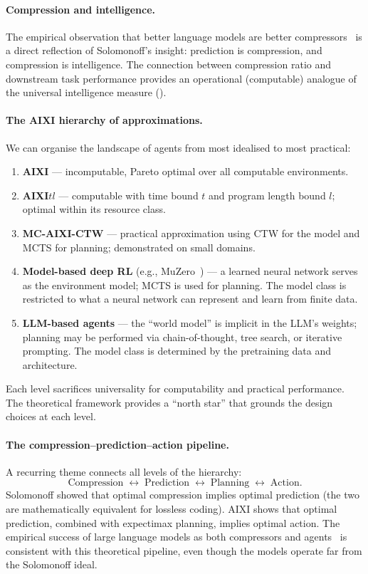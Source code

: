 \documentclass[11pt,a4paper]{article}
\theoremstyle{definition}
\theoremstyle{remark}
\begin{document}
\paragraph{Compression and intelligence.}
The empirical observation that better language models are better
compressors~\cite{Deletang2024} is a direct reflection of Solomonoff's
insight: prediction is compression, and compression is intelligence.
The connection between compression ratio and downstream task performance
provides an operational (computable) analogue of the universal intelligence
measure ().

\paragraph{The AIXI hierarchy of approximations.}
We can organise the landscape of agents from most idealised to most practical:
\begin{enumerate}[nosep]
\item \textbf{AIXI} --- incomputable, Pareto optimal over all computable environments.
\item \textbf{AIXI$tl$} --- computable with time bound $t$ and program length
      bound $l$; optimal within its resource class.
\item \textbf{MC-AIXI-CTW} --- practical approximation using CTW for the model
      and MCTS for planning; demonstrated on small domains.
\item \textbf{Model-based deep RL} (e.g., MuZero~\cite{Schrittwieser2020}) ---
      a learned neural network serves as the environment model; MCTS is used
      for planning.  The model class is restricted to what a neural network
      can represent and learn from finite data.
\item \textbf{LLM-based agents} --- the ``world model'' is implicit in the
      LLM's weights; planning may be performed via chain-of-thought, tree
      search, or iterative prompting.  The model class is determined by the
      pretraining data and architecture.
\end{enumerate}
Each level sacrifices universality for computability and practical
performance.  The theoretical framework provides a ``north star'' that
grounds the design choices at each level.

\paragraph{The compression--prediction--action pipeline.}
A recurring theme connects all levels of the hierarchy:
\[
  \text{Compression} \;\longleftrightarrow\; \text{Prediction}
  \;\longleftrightarrow\; \text{Planning} \;\longleftrightarrow\; \text{Action}.
\]
Solomonoff showed that optimal compression implies optimal prediction
(the two are mathematically equivalent for lossless coding).  AIXI shows
that optimal prediction, combined with expectimax planning, implies optimal
action.  The empirical success of large language models as both compressors
and agents~\cite{Deletang2024} is consistent with this theoretical pipeline,
even though the models operate far from the Solomonoff ideal.
\end{document}
